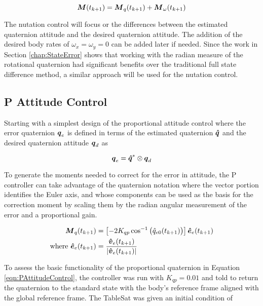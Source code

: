 \begin{equation}
    \boldsymbol{M}(t_{k+1}) = \boldsymbol{M}_{q}(t_{k+1}) + \boldsymbol{M}_{\omega}(t_{k+1})
\end{equation}

The nutation control will focus or the differences between the estimated quaternion attitude and the desired quaternion attitude.  The addition of the desired body rates of $\omega_x = \omega_y = 0$ can be added later if needed.  Since the work in Section \ref{chap:StateError} shows that working with the radian measure of the rotational quaternion had significant benefits over the traditional full state difference method, a similar approach will be used for the nutation control.

\subsection{P Attitude Control}
\label{subsec:PAttitudeControl}

Starting with a simplest design of the proportional attitude control where the error quaternion $\boldsymbol{q}_e$ is defined in terms of the estimated quaternion $\boldsymbol{\hat{q}}$ and the desired quaternion attitude $\boldsymbol{q}_d$ as

\begin{equation}
  \boldsymbol{q}_e = \boldsymbol{\hat{q}}^* \otimes \boldsymbol{q}_d
\end{equation}

To generate the moments needed to correct for the error in attitude, the P controller can take advantage of the quaternion notation where the vector portion identifies the Euler axis, and whose components can be used as the basis for the correction moment by scaling them by the radian angular measurement of the error and a proportional gain.

\begin{subequations}
  \begin{align}
    \boldsymbol{M}_{q}(t_{k+1}) &= \left[-2 K_{qp} \cos^{-1} \big(\hat{q}_{e0}(t_{k+1}) \big) \right] \boldsymbol{\hat{e}}_e(t_{k+1}) \\
    \text{where } \boldsymbol{\hat{e}}_e(t_{k+1}) &= \frac{\boldsymbol{\hat{v}}_e(t_{k+1})}{|\boldsymbol{\hat{v}}_e(t_{k+1})|}
  \end{align}
  \label{eqn:PAttitudeControl}
\end{subequations}

To assess the basic functionality of the proportional quaternion in Equation \ref{eqn:PAttitudeControl}, the controller was run with $K_{qp} = 0.01$ and told to return the quaternion to the standard state with the body's reference frame aligned with the global reference frame.  The TableSat was given an initial condition of

